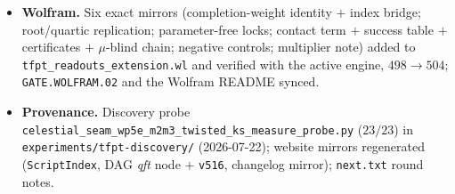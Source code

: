 \begin{itemize}[leftmargin=1.5em]
square'' --- on the way to the eighteen-step story).
\texttt{v516\_celestial\_wp5e\_m2\_twisted\_ks\_measure.py} is cited via \texttt{veri} in both.
\item \textbf{Wolfram.} Six exact mirrors (completion-weight identity $+$ index bridge;
root/quartic replication; parameter-free locks; contact term $+$ success table $+$ certificates
$+$ $\mu$-blind chain; negative controls; multiplier note) added to
\texttt{tfpt\_readouts\_extension.wl} and verified with the active engine, $498\to504$;
\texttt{GATE.WOLFRAM.02} and the Wolfram README synced.
\item \textbf{Provenance.} Discovery probe
\texttt{celestial\_seam\_}\allowbreak\texttt{wp5e\_m2m3\_}\allowbreak\texttt{twisted\_ks\_measure\_probe.py}
($23/23$) in \texttt{experiments/tfpt-discovery/} (2026-07-22); website mirrors regenerated
(\texttt{ScriptIndex}, DAG \emph{qft} node $+$ \texttt{v516}, changelog mirror); \texttt{next.txt}
round notes.
\end{itemize}


